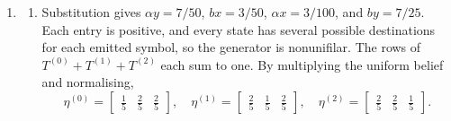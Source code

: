 \begin{solution}[ex:p3-3]
\begin{enumerate}
\begin{enumerate}
          \item The automaton begins
            \[
              \eta^{(1)}\xrightarrow{\,0\,}\eta^{(10)}
              \xrightarrow{\,0\,}\eta^{(100)}
              \xrightarrow{\,0\,}\eta^{(1000)}
              \xrightarrow{\,0\,}\cdots,
            \]
            and every $\eta^{(10^n)}$ with $n\geq1$ has a $1$-transition
            back to $\eta^{(1)}$. Since the first coordinate
            $1/(n+1)$ is different for each $n$, the beliefs are distinct, and
            \[
              \lim_{n\to\infty}\eta^{(10^n)}
                =\begin{bmatrix}0&1\end{bmatrix}.
            \]
            This limiting belief is not reached after any finite history.
            Hence the two hidden generator states induce countably infinitely
            many reachable beliefs.
        \end{enumerate}

      \item
        \begin{enumerate}
          \item Substitution gives
            $\alpha y=7/50$, $bx=3/50$, $\alpha x=3/100$, and
            $by=7/25$. Each entry is positive, and every state has several
            possible destinations for each emitted symbol, so the generator
            is nonunifilar. The rows of $T^{(0)}+T^{(1)}+T^{(2)}$ each sum to
            one. By multiplying the uniform belief and normalising,
            \[
              \eta^{(0)}=\begin{bmatrix}\tfrac15&\tfrac25&\tfrac25\end{bmatrix},
              \quad
              \eta^{(1)}=\begin{bmatrix}\tfrac25&\tfrac15&\tfrac25\end{bmatrix},
              \quad
              \eta^{(2)}=\begin{bmatrix}\tfrac25&\tfrac25&\tfrac15\end{bmatrix}.
            \]


\end{enumerate}
\end{enumerate}
\end{solution}
